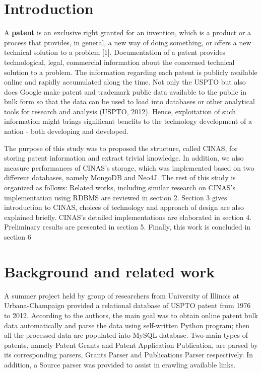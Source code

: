 \documentclass{sig-alternate}
\begin{document}
{\section{Introduction}
A \textbf{patent} is an exclusive right granted for an invention, which is a product or a process that provides, in general, a new way of doing something, or offers a new technical solution to a 
problem [1]. Documentation of a patent provides technological, legal, commercial information about the concerned technical solution to a problem. The information regarding each patent is publicly available online and rapidly accumulated along the time. Not only the USPTO but also does Google make patent and trademark public data available to the public in bulk form so that the data can be used to load into databases or other analytical tools for research and analysis (USPTO, 2012). Hence, exploitation of such information might brings significant benefits to the technology development of a nation - both developing and developed.

The purpose of this study was to proposed the structure, called CINAS, for storing patent information and extract trivial knowledge. In addition, we also measure performances of CINAS's storage, which was implemented based on two different databases, namely MongoDB and Neo4J. The rest of this study is organized as follows: Related works, including similar research on CINAS's implementation using RDBMS are reviewed in section 2. Section 3 gives introduction to CINAS, choices of technology and approach of design are also explained briefly. CINAS's detailed implementations are elaborated in section 4. Preliminary results are presented in section 5. Finally, this work is concluded in section 6

\section{Background and related work}
A summer project held by group of researchers from University of Illinois at Urbana-Champaign provided a relational database of USPTO patent from 1976 to 2012. According to the authors,  the main goal was to obtain online patent bulk data automatically and parse the data using self-written Python program; then all the processed data are populated into MySQL database. Two main types of patents, namely Patent Grants and Patent Application Publication, are parsed by its corresponding parsers, Grants Parser and Publications Parser respectively. In addition, a Source parser was provided to assist in crawling available links.

}
\end{document}
